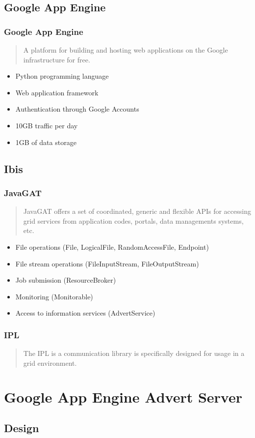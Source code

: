\documentclass{beamer}
\begin{document}
\subsection{Google App Engine}
\frame
{
	\frametitle{Google App Engine}
	\begin{quote}
    A platform for building and hosting web applications on
	the Google infrastructure for free.
    \end{quote}
	
	\begin{itemize}
      \item Python programming language
      \item Web application framework
      \item Authentication through Google Accounts
      \item 10GB traffic per day
      \item 1GB of data storage
    \end{itemize}
}

\subsection{Ibis}
\frame
{
	\frametitle{JavaGAT}
	\begin{quote}
    JavaGAT offers a set of coordinated, generic and flexible APIs for accessing
    grid services from application codes, portals, data managements systems, etc.
    \end{quote}
	
	\begin{itemize}
      \item File operations (File, LogicalFile, RandomAccessFile, Endpoint)
      \item File stream operations (FileInputStream, FileOutputStream)
      \item Job submission (ResourceBroker)
      \item Monitoring (Monitorable)
      \item Access to information services (AdvertService)
    \end{itemize}
}

\frame
{
	\frametitle{IPL}
	\begin{quote}
    The IPL is a communication library is specifically designed for usage in a
    grid environment.
    \end{quote}
}

\section{Google App Engine Advert Server}
\subsection{Design}

\end{document}
